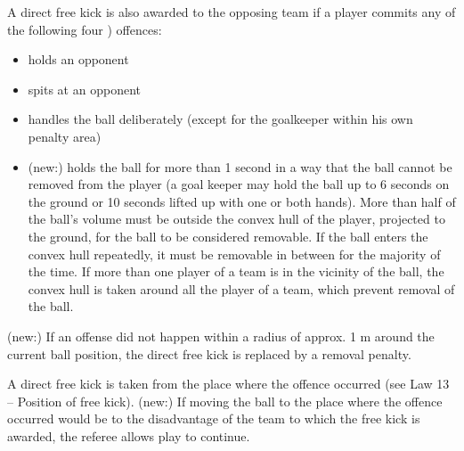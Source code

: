 
\bigskip


A direct free kick is also awarded to the opposing team if a player commits any of the following four ) offences: 

\begin{itemize}
\item holds an opponent
\item spits at an opponent
\item handles the ball deliberately (except for the goalkeeper within his own penalty area)
\item (new:) holds the ball for more than 1 second in a way that the ball cannot be removed from the player (a goal keeper may hold the ball up to 6 seconds on the ground or 10 seconds lifted up with one or both hands). More than half of the ball's volume must be outside the convex hull of the player, projected to the ground, for the ball to be considered removable. If the ball enters the convex hull repeatedly, it must be removable in between for the majority of the time. If more than one player of a team is in the vicinity of the ball, the convex hull is taken around all the player of a team, which prevent removal of the ball.
\end{itemize}

\bigskip

(new:) If an offense did not happen within a radius of approx. 1 m around the current ball position, the direct free kick is replaced by a removal penalty.

\bigskip


A direct free kick is taken from the place where the offence occurred (see Law 13 -- Position of free kick). (new:) If moving the ball to the place where the offence occurred would be to the disadvantage of the team to which the free kick is awarded, the referee allows play to continue.



